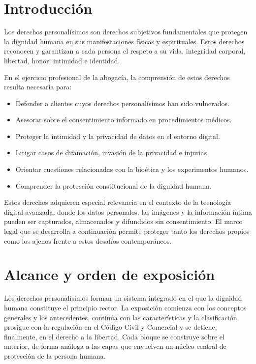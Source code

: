 \documentclass[12pt,oneside]{book}
\begin{document}
\section{Introducción}

Los derechos personalísimos son derechos subjetivos fundamentales que protegen la dignidad humana en sus manifestaciones físicas y espirituales. Estos derechos reconocen y garantizan a cada persona el respeto a su vida, integridad corporal, libertad, honor, intimidad e identidad.

En el ejercicio profesional de la abogacía, la comprensión de estos derechos resulta necesaria para:

\begin{itemize}
    \item Defender a clientes cuyos derechos personalísimos han sido vulnerados.
    \item Asesorar sobre el consentimiento informado en procedimientos médicos.
    \item Proteger la intimidad y la privacidad de datos en el entorno digital.
    \item Litigar casos de difamación, invasión de la privacidad e injurias.
    \item Orientar cuestiones relacionadas con la bioética y los experimentos humanos.
    \item Comprender la protección constitucional de la dignidad humana.
\end{itemize}

Estos derechos adquieren especial relevancia en el contexto de la tecnología digital avanzada, donde los datos personales, las imágenes y la información íntima pueden ser capturados, almacenados y difundidos sin consentimiento. El marco legal que se desarrolla a continuación permite proteger tanto los derechos propios como los ajenos frente a estos desafíos contemporáneos.

\section{Alcance y orden de exposición}

Los derechos personalísimos forman un sistema integrado en el que la dignidad humana constituye el principio rector. La exposición comienza con los conceptos generales y los antecedentes, continúa con las características y la clasificación, prosigue con la regulación en el Código Civil y Comercial y se detiene, finalmente, en el derecho a la libertad. Cada bloque se construye sobre el anterior, de forma análoga a las capas que envuelven un núcleo central de protección de la persona humana.
\end{document}
